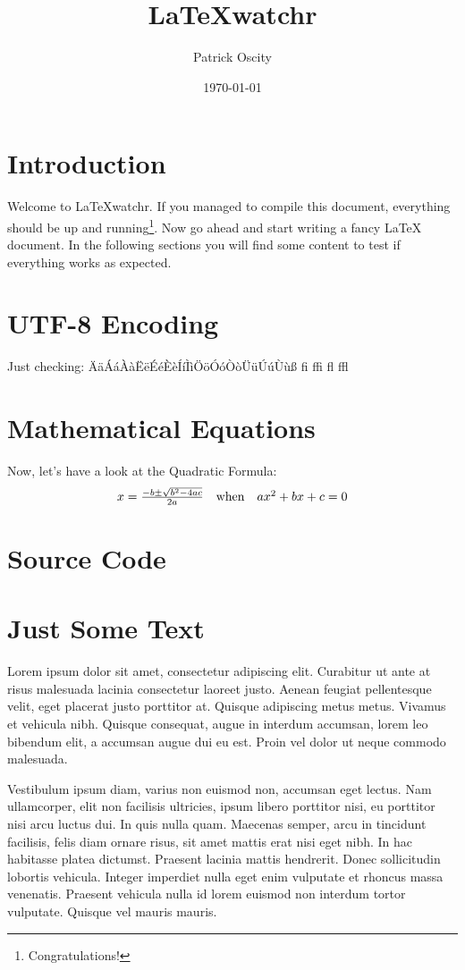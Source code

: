 \documentclass[a4paper,12pt]{scrartcl}
\title{\LaTeX{}watchr}
\author{Patrick Oscity}
\date{\today}
\begin{document}
	\maketitle
	\tableofcontents
	\pagebreak

	\section{Introduction}
	Welcome to \LaTeX{}watchr. If you managed to compile this document,
	everything should be up and running\footnote{Congratulations!}. Now
	go ahead and start writing a fancy \LaTeX{} document. In the
	following sections you will find some content to test if everything
	works as expected.

	\section{UTF-8 Encoding}
	Just checking: ÄäÁáÀàËëÉéÈèÍíÌìÖöÓóÒòÜüÚúÙùß fi ffi fl ffl

	\section{Mathematical Equations}
	Now, let's have a look at the Quadratic Formula:
	\begin{equation}
		\begin{array}{*{20}c}
			{x = \frac{{ - b \pm \sqrt {b^2  - 4ac} }}{{2a}}} &
			{{\rm{when}}} & {ax^2  + bx + c = 0}  \\
		\end{array}
	\end{equation}

	\section{Source Code}
	
	
	\section{Just Some Text}
	Lorem ipsum dolor sit amet, consectetur adipiscing elit. Curabitur
	ut ante at risus malesuada lacinia consectetur laoreet justo. Aenean
	feugiat pellentesque velit, eget placerat justo porttitor at.
	Quisque adipiscing metus metus. Vivamus et vehicula nibh. Quisque
	consequat, augue in interdum accumsan, lorem leo bibendum elit, a
	accumsan augue dui eu est. Proin vel dolor ut neque commodo malesuada.
	\par
	Vestibulum ipsum diam, varius non euismod non, accumsan eget lectus.
	Nam ullamcorper, elit non facilisis ultricies, ipsum libero porttitor
	nisi, eu porttitor nisi arcu luctus dui. In quis nulla quam. Maecenas
	semper, arcu in tincidunt facilisis, felis diam ornare risus, sit amet
	mattis erat nisi eget nibh. In hac habitasse platea dictumst. Praesent
	lacinia mattis hendrerit. Donec sollicitudin lobortis vehicula.
	Integer imperdiet nulla eget enim vulputate et rhoncus massa
	venenatis. Praesent vehicula nulla id lorem euismod non interdum
	tortor vulputate. Quisque vel mauris mauris.
\end{document}
